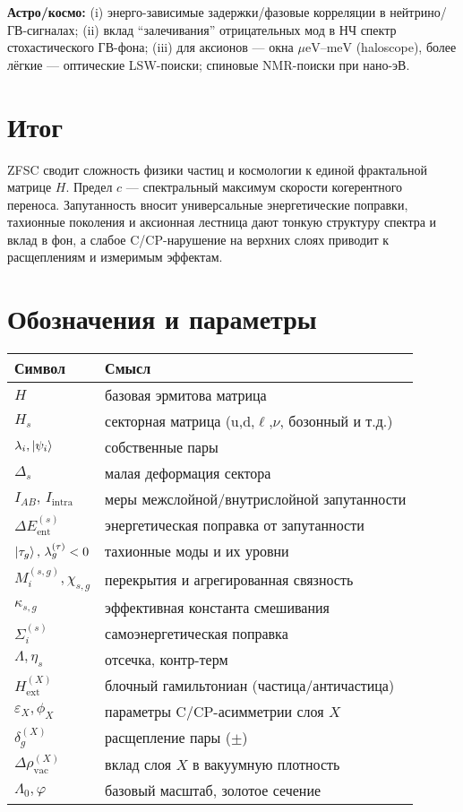 \documentclass[12pt,a4paper]{article}
\begin{document}
\textbf{Астро/космо:} (i) энерго-зависимые задержки/фазовые корреляции в нейтрино/ГВ-сигналах; (ii) вклад ``залечивания'' отрицательных мод в НЧ спектр стохастического ГВ-фона; (iii) для аксионов --- окна $\mu\mathrm{eV}$--$\mathrm{meV}$ (haloscope), более лёгкие --- оптические LSW-поиски; спиновые NMR-поиски при нано-эВ.

\section*{Итог}
ZFSC сводит сложность физики частиц и космологии к единой фрактальной матрице $H$. Предел $c$ --- спектральный максимум скорости когерентного переноса. Запутанность вносит универсальные энергетические поправки, тахионные поколения и аксионная лестница дают тонкую структуру спектра и вклад в фон, а слабое C/CP-нарушение на верхних слоях приводит к расщеплениям и измеримым эффектам.

\appendix
\section{Обозначения и параметры}
\begin{tabular}{ll}
\toprule
Символ & Смысл \\
\midrule
$H$ & базовая эрмитова матрица \\
$H_s$ & секторная матрица (u,d,$\ell$,$\nu$, бозонный и т.д.) \\
$\lambda_i,\ket{\psi_i}$ & собственные пары \\
$\Delta_s$ & малая деформация сектора \\
$I_{AB},\,I_{\text{intra}}$ & меры межслойной/внутрислойной запутанности \\
$\Delta E^{(s)}_{\text{ent}}$ & энергетическая поправка от запутанности \\
$\ket{\tau_g},\,\lambda^{(\tau)}_g<0$ & тахионные моды и их уровни \\
$M^{(s,g)}_i,\chi_{s,g}$ & перекрытия и агрегированная связность \\
$\kappa_{s,g}$ & эффективная константа смешивания \\
$\Sigma^{(s)}_i$ & самоэнергетическая поправка \\
$\Lambda,\eta_s$ & отсечка, контр-терм \\
$H_{\text{ext}}^{(X)}$ & блочный гамильтониан (частица/античастица) \\
$\varepsilon_X,\phi_X$ & параметры C/CP-асимметрии слоя $X$ \\
$\delta^{(X)}_g$ & расщепление пары ($\pm$) \\
$\Delta\rho_{\text{vac}}^{(X)}$ & вклад слоя $X$ в вакуумную плотность \\
$\Lambda_0,\varphi$ & базовый масштаб, золотое сечение \\
\bottomrule
\end{tabular}
\end{document}
